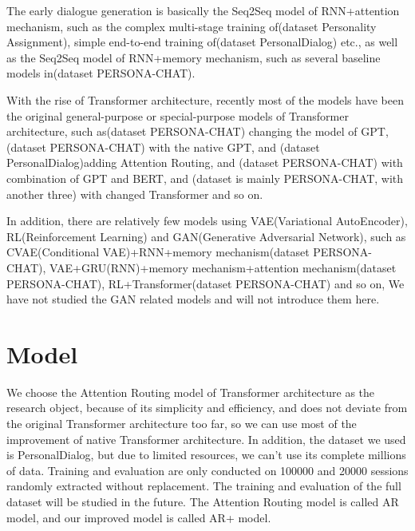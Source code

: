 \documentclass[letterpaper]{article} %
\DeclareRobustCommand{\citeext}[1]{\cite[#1]{#1}}
\begin{document}
The early dialogue generation is basically the Seq2Seq model\citeext{SutskeverGoogle2014} of RNN+attention mechanism\citeext{Bahdanau2015}, such as the complex multi-stage training of\citeext{Qian2017}(dataset Personality Assignment), simple end-to-end training of\citeext{Zheng2019a}(dataset PersonalDialog) etc., as well as the Seq2Seq model of RNN+memory mechanism\citeext{Sukhbaatar2015}, such as several baseline models in\citeext{Zhang2018}(dataset PERSONA-CHAT). 

With the rise of Transformer architecture, recently most of the models have been the original general-purpose or special-purpose models of Transformer architecture, such as\citeext{Tselousov2018}(dataset PERSONA-CHAT) changing the model of GPT\citeext{Radford2018}, \citeext{Wolf2019}(dataset PERSONA-CHAT) with the native GPT, and \citeext{Zheng2019}(dataset PersonalDialog)adding Attention Routing, and \citeext{Liu2020}(dataset PERSONA-CHAT) with combination of GPT and BERT, and \citeext{Roller2020}(dataset is mainly PERSONA-CHAT, with another three) with changed Transformer and so on. 

In addition, there are relatively few models using VAE(Variational AutoEncoder), RL(Reinforcement Learning) and GAN(Generative Adversarial Network), such as CVAE(Conditional VAE)+RNN+memory mechanism\citeext{Song2019}(dataset PERSONA-CHAT), VAE+GRU(RNN)+memory mechanism+attention mechanism\citeext{Xu2020}(dataset PERSONA-CHAT), RL+Transformer\citeext{Liu2020}(dataset PERSONA-CHAT) and so on, We have not studied the GAN related models and will not introduce them here. 

\section[Model]{Model} 

We choose the Attention Routing model of Transformer architecture\citeext{Zheng2019} as the research object, because of its simplicity and efficiency, and does not deviate from the original Transformer architecture too far, so we can use most of the improvement of native Transformer architecture. In addition, the dataset we used is PersonalDialog, but due to limited resources, we can't use its complete millions of data. Training and evaluation are only conducted on 100000 and 20000 sessions randomly extracted without replacement. The training and evaluation of the full dataset will be studied in the future. The Attention Routing model is called AR model, and our improved model is called AR+ model. 
\end{document}
